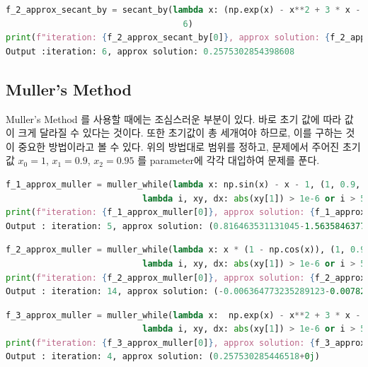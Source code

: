 \documentclass[11pt]{article}
\begin{document}
\begin{lstlisting}[language=Python]
f_2_approx_secant_by = secant_by(lambda x: (np.exp(x) - x**2 + 3 * x - 2), 1, 0.9,
                                   6)
print(f"iteration: {f_2_approx_secant_by[0]}, approx solution: {f_2_approx_secant_by[1]}")
Output :iteration: 6, approx solution: 0.2575302854398608
\end{lstlisting}












\subsection{Muller's Method} 


Muller's Method 를 사용할 때에는 조심스러운 부분이 있다. 바로 초기 값에 따라 값이 크게 달라질 수 있다는 것이다. 또한 초기값이 총 세개여야 하므로, 이를 구하는 것이 중요한 방법이라고 볼 수 있다. 위의 방법대로 범위를 정하고, 문제에서 주어진 초기값 $x_0 = 1$, $x_1 = 0.9$, $x_2 = 0.95$ 를 parameter에 각각 대입하여 문제를 푼다.

\begin{lstlisting}[language=Python]
f_1_approx_muller = muller_while(lambda x: np.sin(x) - x - 1, (1, 0.9, 0.95), 
                           lambda i, xy, dx: abs(xy[1]) > 1e-6 or i > 500)
print(f"iteration: {f_1_approx_muller[0]}, approx solution: {f_1_approx_muller[1]}")
Output : iteration: 5, approx solution: (0.816463531131045-1.5635846377499045j)
\end{lstlisting}

\begin{lstlisting}[language=Python]
f_2_approx_muller = muller_while(lambda x: x * (1 - np.cos(x)), (1, 0.9, 0.95), 
                           lambda i, xy, dx: abs(xy[1]) > 1e-6 or i > 500)
print(f"iteration: {f_2_approx_muller[0]}, approx solution: {f_2_approx_muller[1]}")
Output : iteration: 14, approx solution: (-0.006364773235289123-0.007825774561814524j)
\end{lstlisting}

\begin{lstlisting}[language=Python]
f_3_approx_muller = muller_while(lambda x:  np.exp(x) - x**2 + 3 * x - 2, (1, 0.9, 0.95), 
                           lambda i, xy, dx: abs(xy[1]) > 1e-6 or i > 500)
print(f"iteration: {f_3_approx_muller[0]}, approx solution: {f_3_approx_muller[1]}")
Output : iteration: 4, approx solution: (0.257530285446518+0j)
\end{lstlisting}
\end{document}
